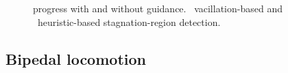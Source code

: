\documentclass{article}
\begin{document}
\begin{figure}[t]%
  \centering%
%
%
  \caption{%
    \mhastar progress with and without guidance.
    ~vacillation-based 
    and
    ~heuristic-based
    stagnation-region detection.
		}

  \label{fig:detection_plot}%

  \vspace{-4.5mm}

\end{figure}

\subsection{Bipedal locomotion}
\label{subsec:locomotion}



\end{document}
